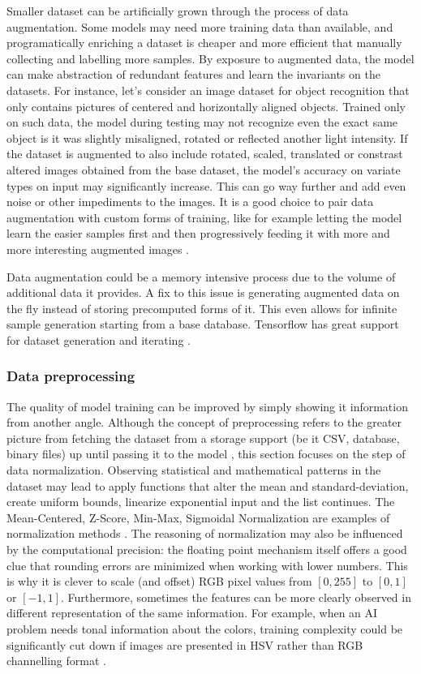 Smaller dataset can be artificially grown through the process of data augmentation. Some models may need more training data than available, and programatically enriching a dataset is cheaper and more efficient that manually collecting and labelling more samples. By exposure to augmented data, the model can make abstraction of redundant features and learn the invariants on the datasets. For instance, let's consider an image dataset for object recognition that only contains pictures of centered and horizontally aligned objects. Trained only on such data, the model during testing may not recognize even the exact same object is it was slightly misaligned, rotated or reflected another light intensity. If the dataset is augmented to also include rotated, scaled, translated or constrast altered images obtained from the base dataset, the model's accuracy on variate types on input may significantly increase. This can go way further and add even noise or other impediments to the images. It is a good choice to pair data augmentation with custom forms of training, like for example letting the model learn the easier samples first and then progressively feeding it with more and more interesting augmented images \cite{augmentation}. 

Data augmentation could be a memory intensive process due to the volume of additional data it provides. A fix to this issue is generating augmented data on the fly instead of storing precomputed forms of it. This even allows for infinite sample generation starting from a base database. Tensorflow has great support for dataset generation and iterating \cite{Tensorflow}.

\subsubsection{Data preprocessing}
\label{subsubsec:ch3sec3subsec7subsubsec3}

The quality of model training can be improved by simply showing it information from another angle. Although the concept of preprocessing refers to the greater picture from fetching the dataset from a storage support (be it CSV, database, binary files) up until passing it to the model \cite{D2l}, this section focuses on the step of data normalization. Observing statistical and mathematical patterns in the dataset may lead to apply functions that alter the mean and standard-deviation, create uniform bounds, linearize exponential input and the list continues. The Mean-Centered, Z-Score, Min-Max, Sigmoidal Normalization are examples of normalization methods \cite{normalization}. The reasoning of normalization may also be influenced by the computational precision: the floating point mechanism itself offers a good clue that rounding errors are minimized when working with lower numbers. This is why it is clever to scale (and offset) RGB pixel values from $[0,255]$ to $[0,1]$ or $[-1,1]$. Furthermore, sometimes the features can be more clearly observed in different representation of the same information. For example, when an AI problem needs tonal information about the colors, training complexity could be significantly cut down if images are presented in HSV rather than RGB channelling format \cite{pixel_norm}.

